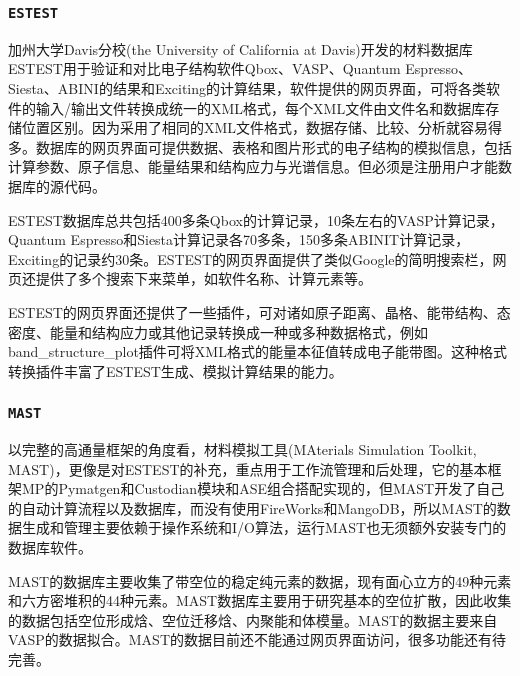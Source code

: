 \frame
{
\frametitle{\tt{ESTEST}}
加州大学\textrm{Davis}分校\textrm{(the University of California at Davis)}开发的材料数据库\textrm{ESTEST}\cite{ESTEST_URL,CSD3-015004_2010,CPC183-1744_2010}用于验证和对比电子结构软件\textrm{Qbox}、\textrm{VASP}、\textrm{Quantum Espresso}、\textrm{Siesta}、\textrm{ABINI}的结果和\textrm{Exciting}的计算结果，软件提供的网页界面，可将各类软件的输入/输出文件转换成统一的\textrm{XML}格式，每个\textrm{XML}文件由文件名和数据库存储位置区别。因为采用了相同的\textrm{XML}文件格式，数据存储、比较、分析就容易得多。数据库的网页界面可提供数据、表格和图片形式的电子结构的模拟信息，包括计算参数、原子信息、能量结果和结构应力与光谱信息。但必须是注册用户才能数据库的源代码。

\textrm{ESTEST}数据库总共包括400多条\textrm{Qbox}的计算记录，10条左右的\textrm{VASP}计算记录，\textrm{Quantum Espresso}和\textrm{Siesta}计算记录各70多条，150多条\textrm{ABINIT}计算记录，\textrm{Exciting}的记录约30条。\textrm{ESTEST}的网页界面提供了类似\textrm{Google}的简明搜索栏，网页还提供了多个搜索下来菜单，如软件名称、计算元素等。

\textrm{ESTEST}的网页界面还提供了一些插件，可对诸如原子距离、晶格、能带结构、态密度、能量和结构应力或其他记录转换成一种或多种数据格式，例如\textrm{band\_structure\_plot}插件可将\textrm{XML}格式的能量本征值转成电子能带图。这种格式转换插件丰富了\textrm{ESTEST}生成、模拟计算结果的能力。
}

\frame
{
\frametitle{\tt{MAST}}
以完整的高通量框架的角度看，材料模拟工具\textrm{(MAterials Simulation Toolkit, MAST)}，更像是对\textrm{ESTEST}的补充，重点用于工作流管理和后处理\cite{MAST_URL}，它的基本框架\textrm{MP}的\textrm{Pymatgen}和\textrm{Custodian}模块和\textrm{ASE}组合搭配实现的，但\textrm{MAST}开发了自己的自动计算流程以及数据库，而没有使用\textrm{FireWorks}和\textrm{MangoDB}，所以\textrm{MAST}的数据生成和管理主要依赖于操作系统和\textrm{I/O}算法，运行\textrm{MAST}也无须额外安装专门的数据库软件。

\textrm{MAST}的数据库主要收集了带空位的稳定纯元素的数据，现有面心立方的49种元素和六方密堆积的44种元素。\textrm{MAST}数据库主要用于研究基本的空位扩散，因此收集的数据包括空位形成焓、空位迁移焓、内聚能和体模量\cite{NJP16-015108_2014}。\textrm{MAST}的数据主要来自\textrm{VASP}的数据拟合。\textrm{MAST}的数据目前还不能通过网页界面访问，很多功能还有待完善。
}

